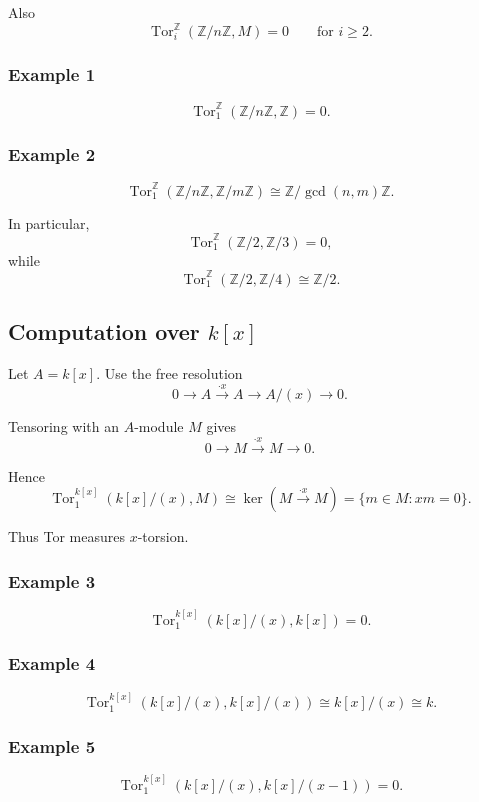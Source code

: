\documentclass[12pt,a4paper]{article}
\theoremstyle{notespace}
\begin{document}
Also
\[
\operatorname{Tor}_i^{\mathbb Z}(\mathbb Z/n\mathbb Z,M)=0
\qquad\text{for }i\ge 2.
\]

\subsubsection*{Example 1}
\[
\operatorname{Tor}_1^{\mathbb Z}(\mathbb Z/n\mathbb Z,\mathbb Z)=0.
\]

\subsubsection*{Example 2}
\[
\operatorname{Tor}_1^{\mathbb Z}(\mathbb Z/n\mathbb Z,\mathbb Z/m\mathbb Z)
\cong
\mathbb Z/\gcd(n,m)\mathbb Z.
\]

In particular,
\[
\operatorname{Tor}_1^{\mathbb Z}(\mathbb Z/2,\mathbb Z/3)=0,
\]
while
\[
\operatorname{Tor}_1^{\mathbb Z}(\mathbb Z/2,\mathbb Z/4)\cong \mathbb Z/2.
\]

\subsection{Computation over \(k[x]\)}

Let \(A=k[x]\). Use the free resolution
\[
0\longrightarrow A \xrightarrow{\cdot x} A \longrightarrow A/(x)\longrightarrow 0.
\]

Tensoring with an \(A\)-module \(M\) gives
\[
0\longrightarrow M \xrightarrow{\cdot x} M \longrightarrow 0.
\]

Hence
\[
\operatorname{Tor}_1^{k[x]}(k[x]/(x),M)
\cong
\ker(M\xrightarrow{\cdot x}M)
=
\{m\in M:xm=0\}.
\]

Thus Tor measures \(x\)-torsion.

\subsubsection*{Example 3}
\[
\operatorname{Tor}_1^{k[x]}(k[x]/(x),k[x])=0.
\]

\subsubsection*{Example 4}
\[
\operatorname{Tor}_1^{k[x]}(k[x]/(x),k[x]/(x))
\cong
k[x]/(x)\cong k.
\]

\subsubsection*{Example 5}
\[
\operatorname{Tor}_1^{k[x]}(k[x]/(x),k[x]/(x-1))=0.
\]
\end{document}
